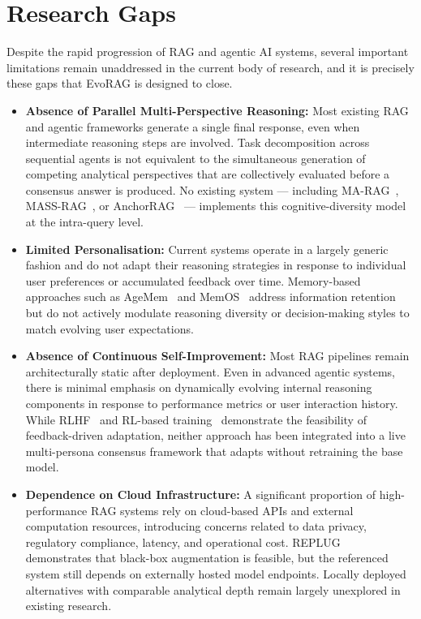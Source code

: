 \section{Research Gaps}

Despite the rapid progression of RAG and agentic AI systems, several important
limitations remain unaddressed in the current body of research, and it is precisely
these gaps that EvoRAG is designed to close.

\begin{itemize}

    \item \textbf{Absence of Parallel Multi-Perspective Reasoning:}
    Most existing RAG and agentic frameworks generate a single final response, even
    when intermediate reasoning steps are involved. Task decomposition across sequential
    agents is not equivalent to the simultaneous generation of competing analytical
    perspectives that are collectively evaluated before a consensus answer is produced.
    No existing system — including MA-RAG~\cite{nguyen2025marag},
    MASS-RAG~\cite{xiao2026massrag}, or AnchorRAG~\cite{xu2026anchorrag} — implements
    this cognitive-diversity model at the intra-query level.

    \item \textbf{Limited Personalisation:}
    Current systems operate in a largely generic fashion and do not adapt their reasoning
    strategies in response to individual user preferences or accumulated feedback over
    time. Memory-based approaches such as AgeMem~\cite{chen2026agemem} and
    MemOS~\cite{bai2025memos} address information retention but do not actively
    modulate reasoning diversity or decision-making styles to match evolving user
    expectations.

    \item \textbf{Absence of Continuous Self-Improvement:}
    Most RAG pipelines remain architecturally static after deployment. Even in advanced
    agentic systems, there is minimal emphasis on dynamically evolving internal reasoning
    components in response to performance metrics or user interaction history.
    While RLHF~\cite{ouyang2022rlhf} and RL-based training~\cite{zheng2025deepdx}
    demonstrate the feasibility of feedback-driven adaptation, neither approach has been
    integrated into a live multi-persona consensus framework that adapts without
    retraining the base model.

    \item \textbf{Dependence on Cloud Infrastructure:}
    A significant proportion of high-performance RAG systems rely on cloud-based APIs
    and external computation resources, introducing concerns related to data privacy,
    regulatory compliance, latency, and operational cost. REPLUG~\cite{shi2023replug}
    demonstrates that black-box augmentation is feasible, but the referenced system
    still depends on externally hosted model endpoints. Locally deployed alternatives
    with comparable analytical depth remain largely unexplored in existing research.


\end{itemize}
